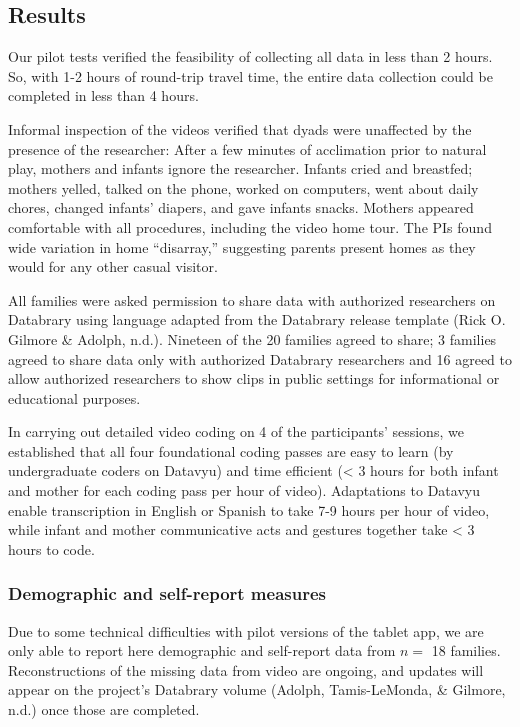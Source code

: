 \documentclass[english,man]{apa6}
\theoremstyle{definition}
\theoremstyle{definition}
\theoremstyle{definition}
\theoremstyle{remark}
\begin{document}
\subsection{Results}\label{results}

Our pilot tests verified the feasibility of collecting all data in less
than 2 hours. So, with 1-2 hours of round-trip travel time, the entire
data collection could be completed in less than 4 hours.

Informal inspection of the videos verified that dyads were unaffected by
the presence of the researcher: After a few minutes of acclimation prior
to natural play, mothers and infants ignore the researcher. Infants
cried and breastfed; mothers yelled, talked on the phone, worked on
computers, went about daily chores, changed infants' diapers, and gave
infants snacks. Mothers appeared comfortable with all procedures,
including the video home tour. The PIs found wide variation in home
\enquote{disarray,} suggesting parents present homes as they would for
any other casual visitor.

All families were asked permission to share data with authorized
researchers on Databrary using language adapted from the Databrary
release template (Rick O. Gilmore \& Adolph, n.d.). Nineteen of the 20
families agreed to share; 3 families agreed to share data only with
authorized Databrary researchers and 16 agreed to allow authorized
researchers to show clips in public settings for informational or
educational purposes.

In carrying out detailed video coding on 4 of the participants'
sessions, we established that all four foundational coding passes are
easy to learn (by undergraduate coders on Datavyu) and time efficient
(\textless{} 3 hours for both infant and mother for each coding pass per
hour of video). Adaptations to Datavyu enable transcription in English
or Spanish to take 7-9 hours per hour of video, while infant and mother
communicative acts and gestures together take \textless{} 3 hours to
code.

\subsubsection{Demographic and self-report
measures}\label{demographic-and-self-report-measures}

Due to some technical difficulties with pilot versions of the tablet
app, we are only able to report here demographic and self-report data
from \(n=\) 18 families. Reconstructions of the missing data from video
are ongoing, and updates will appear on the project's Databrary volume
(Adolph, Tamis-LeMonda, \& Gilmore, n.d.) once those are completed.
\end{document}
